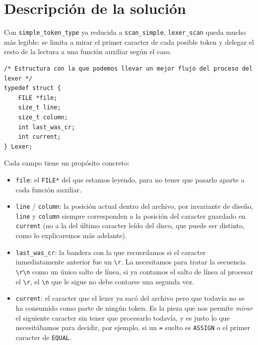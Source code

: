 \documentclass[12pt,letterpaper]{article}
\begin{document}
\section*{Descripción de la solución}

Con \texttt{simple\_token\_type} ya reducida a \texttt{scan\_simple}, \texttt{lexer\_scan} queda mucho más
legible: se limita a mirar el primer caracter de cada posible token y delegar el resto de la lectura a una
función auxiliar según el caso.

\begin{lstlisting}[style=modernc, caption={La estructura \texttt{Lexer}, definida en \texttt{lexer.h}.}]
/* Estructura con la que podemos llevar un mejor flujo del proceso del lexer */
typedef struct {
    FILE *file;
    size_t line;
    size_t column;
    int last_was_cr;
    int current;
} Lexer;
\end{lstlisting}
\bigskip

Cada campo tiene un propósito concreto:

\begin{itemize}
\item \texttt{file}: el \texttt{FILE*} del que estamos leyendo, para no tener que pasarlo aparte a cada
  función auxiliar.
  
\item \texttt{line} / \texttt{column}: la posición actual dentro del archivo, por invariante de diseño,
  \texttt{line} y \texttt{column} siempre corresponden a la posición del caracter guardado en
  \texttt{current} (no a la del último caracter leído del disco, que puede ser distinto, como
  lo explicaremos más adelante).
  
\item \texttt{last\_was\_cr}: la bandera con la que recuerdamos si el caracter inmediatamente anterior fue un
  \texttt{\textbackslash r}. La necesitamos para tratar la secuencia \texttt{\textbackslash r\textbackslash n}
  como un único salto de línea, si ya contamos el salto de línea al procesar el \texttt{\textbackslash r},
  el \texttt{\textbackslash n} que le sigue no debe contarse una segunda vez.
  
\item \texttt{current}: el caracter que el lexer ya sacó del archivo pero que todavía no se ha consumido
  como parte de ningún token. Es la pieza que nos permite \emph{mirar} el siguiente caracter sin tener
  que procesarlo todavía, y es justo lo que necesitábamos para decidir, por ejemplo, si un
  \texttt{=} suelto es \texttt{ASSIGN} o el primer caracter de \texttt{EQUAL}.
\end{itemize}
\end{document}
